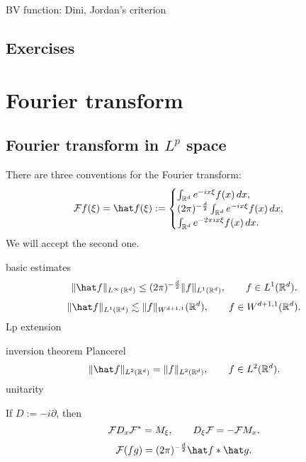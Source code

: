 \documentclass{../../large}
\begin{document}
BV function: Dini, Jordan's criterion
\begin{prb}
\end{prb}





\section*{Exercises}
\begin{prb}
\end{prb}
\begin{prb}
\end{prb}







\chapter{Fourier transform}
\section{Fourier transform in $L^p$ space}
There are three conventions for the Fourier transform:
\[\cF f(\xi)=\hat f(\xi):=\begin{cases}
\int_{\R^d}e^{-ix\xi}f(x)\,dx,\\
(2\pi)^{-\frac d2}\int_{\R^d}e^{-ix\xi}f(x)\,dx,\\
\int_{\R^d}e^{-2\pi ix\xi}f(x)\,dx.
\end{cases}\]
We will accept the second one.


\begin{prb}
basic estimates
\[\|\hat f\|_{L^\infty(\R^d)}\le(2\pi)^{-\frac d2}\|f\|_{L^1(\R^d)},\qquad f\in L^1(\R^d).\]
\[\|\hat f\|_{L^1(\R^d)}\lesssim\|f\|_{W^{d+1,1}}(\R^d),\qquad f\in W^{d+1,1}(\R^d).\]
Lp extension
\end{prb}

\begin{prb}
inversion theorem
Plancerel
\[\|\hat f\|_{L^2(\R^d)}=\|f\|_{L^2(\R^d)},\qquad f\in L^2(\R^d).\]
unitarity
\end{prb}

\begin{prb}[Properties]
If $D:=-i\partial$, then
\[\mathcal{F} D_x\mathcal{F}^*=M_\xi,\qquad D_\xi\mathcal{F}=-\mathcal{F} M_x.\]
\[\cF(fg)=(2\pi)^{-\frac d2}\hat f*\hat g.\]
\end{prb}
\end{document}
